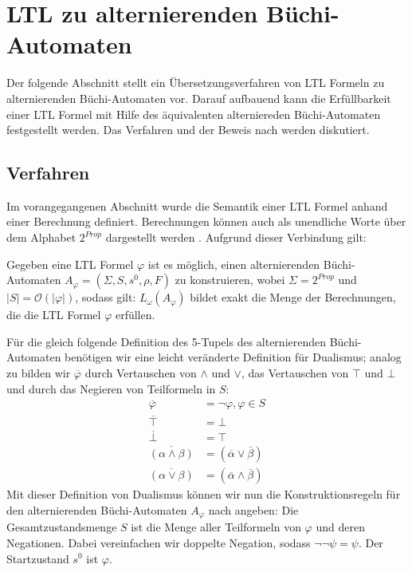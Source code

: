 \section{LTL zu alternierenden Büchi-Automaten}

Der folgende Abschnitt stellt ein Übersetzungsverfahren von LTL Formeln zu alternierenden Büchi-Automaten vor. Darauf aufbauend kann die Erfüllbarkeit einer LTL Formel mit Hilfe des äquivalenten alterniereden Büchi-Automaten festgestellt werden. Das Verfahren und der Beweis nach \cite{vardi+96} werden diskutiert.


\subsection{Verfahren}
\label{subsection:verfahren}
Im vorangegangenen Abschnitt wurde die Semantik einer LTL Formel anhand einer Berechnung definiert. Berechnungen können auch als unendliche Worte über dem Alphabet $2^{Prop}$ dargestellt werden \cite{vardi+96}. Aufgrund dieser Verbindung gilt:
\begin{satz}\cite{vardi+96}
\label{LTL->ABA}
    Gegeben eine LTL Formel $\varphi$ ist es möglich, einen alternierenden Büchi-Automaten $A_\varphi = (\Sigma, S, s^0, \rho, F)$ zu konstruieren, wobei $\Sigma = 2^{Prop}$ und $|S| = \mathcal{O}(|\varphi|)$, sodass gilt: $L_\omega(A_\varphi)$ bildet exakt die Menge der Berechnungen, die die LTL Formel $\varphi$ erfüllen.
\end{satz}
Für die gleich folgende Definition des 5-Tupels des alternierenden Büchi-Automaten benötigen wir eine leicht veränderte Definition für Dualismus; analog zu \cite{vardi+96} bilden wir $\overline{\varphi}$ durch Vertauschen von $\land$ und $\lor$, das Vertauschen von $\top$ und $\bot$ und durch das Negieren von Teilformeln in $S$:
\begin{equation}
\label{aba-zu-ltl:dualismus}
\begin{split}
    \overline{\varphi} &= \lnot\varphi, \varphi \in S\\
    \overline{\top} &= \bot\\
    \overline{\bot} &= \top\\
    \overline{(\alpha \land \beta)} &= (\overline{\alpha} \lor \overline{\beta})\\
    \overline{(\alpha \lor \beta)} &= (\overline{\alpha} \land \overline{\beta})
\end{split}
\end{equation}
Mit dieser Definition von Dualismus können wir nun die Konstruktionsregeln für den alternierenden Büchi-Automaten $A_\varphi$ nach \cite{vardi+96} angeben: Die Gesamtzustandsmenge $S$ ist die Menge aller Teilformeln von $\varphi$ und deren Negationen. Dabei vereinfachen wir doppelte Negation, sodass $\lnot\lnot\psi = \psi$. Der Startzustand $s^0$ ist $\varphi$. 
